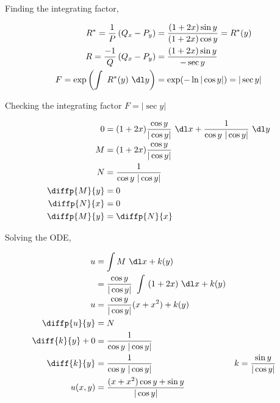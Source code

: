 \begin{enumerate}
\begin{enumerate}
                    Finding the integrating factor,

                    \begin{align}
                        R^{*} = \frac{1}{P} \left( Q_{x} - P_{y} \right) & = \frac{(1+2x) \sin y}{(1+2x) \cos y}    = R^{*}(y) \\
                        R = \frac{-1}{Q}\left( Q_{x} - P_{y} \right)     & = \frac{(1+2x) \sin y}{- \sec y}                    \\
                        F = \exp \left( \int\ R^{*}(y)\ \dl y\right)     & = \exp (-\ln |\cos y|) = | \sec y |
                    \end{align}

                    Checking the integrating factor $ F = | \sec y | $

                    \begin{align}
                        0            & = (1 +2x) \frac{\cos y}{|\cos y|}\ \dl x + \frac{1}{\cos y\ |\cos y|} \ \dl y \\
                        M            & = (1 +2x) \frac{\cos y}{|\cos y|}                                             \\
                        N            & = \frac{1}{\cos y\ |\cos y|}                                                  \\
                        \diffp{M}{y} & = 0                                                                           \\
                        \diffp{N}{x} & = 0                                                                           \\
                        \diffp{M}{y} & = \diffp{N}{x}
                    \end{align}

                    Solving the ODE,

                    \begin{align}
                        u               & = \int M\ \dl x + k(y)                                                                \\
                                        & = \frac{\cos y}{|\cos y|}\ \int\ (1+2x)\ \dl x + k(y)                                 \\
                        u               & = \frac{\cos y}{|\cos y|} (x + x^{2}) + k(y)                                          \\
                        \diffp{u}{y}    & = N                                                                                   \\
                        \diff{k}{y} + 0 & = \frac{1}{\cos y\ |\cos y|}                                                          \\
                        \diff{k}{y}     & = \frac{1}{\cos y\ |\cos y|}                          & k & = \frac{\sin y}{|\cos y|} \\
                        u(x, y)         & = \frac{(x+x^{2})\cos y + \sin y}{|\cos y|}
                    \end{align}


\end{enumerate}
\end{enumerate}
